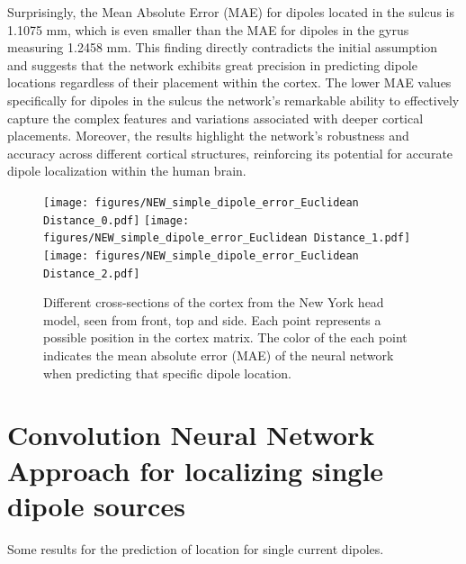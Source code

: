 \documentclass[a4paper, UKenglish, 11pt]{uiomaster}
\begin{document}
Surprisingly, the Mean Absolute Error (MAE) for dipoles located in the sulcus is 1.1075 mm, which is even smaller than the MAE for dipoles in the gyrus measuring 1.2458 mm. This finding directly contradicts the initial assumption and suggests that the network exhibits great precision in predicting dipole locations regardless of their placement within the cortex. The lower MAE values specifically for dipoles in the sulcus  the network's remarkable ability to effectively capture the complex features and variations associated with deeper cortical placements. Moreover, the results highlight the network's robustness and accuracy across different cortical structures, reinforcing its potential for accurate dipole localization within the human brain.


\begin{figure}[!htb]
    \centering
    \texttt{[image: figures/NEW\_simple\_dipole\_error\_Euclidean Distance\_0.pdf]}
    \vspace{10pt} %
    \texttt{[image: figures/NEW\_simple\_dipole\_error\_Euclidean Distance\_1.pdf]}
    \vspace{10pt} %
    \texttt{[image: figures/NEW\_simple\_dipole\_error\_Euclidean Distance\_2.pdf]}
    \caption{Different cross-sections of the cortex from the New York head model, seen from front, top and side. Each point represents a possible position in the cortex matrix. The color of the each point indicates the mean absolute error (MAE) of the neural network when predicting that specific dipole location.}
    \label{fig:MAE_crossections}
\end{figure}



\section{Convolution Neural Network Approach for localizing single dipole sources}

Some results for the prediction of location for single current dipoles.
\end{document}
